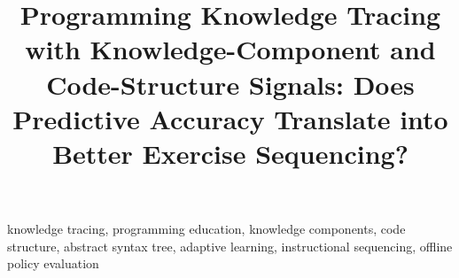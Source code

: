 \documentclass[conference]{IEEEtran}
\begin{document}
\title{Programming Knowledge Tracing with Knowledge-Component and
Code-Structure Signals: Does Predictive Accuracy Translate into Better
Exercise Sequencing?}

\author{
}

\maketitle



\begin{IEEEkeywords}
knowledge tracing, programming education, knowledge components,
code structure, abstract syntax tree, adaptive learning,
instructional sequencing, offline policy evaluation
\end{IEEEkeywords}












\end{document}
